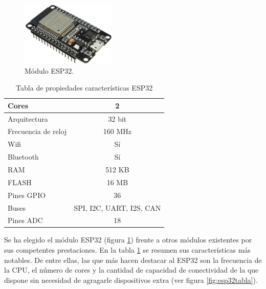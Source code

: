 	\begin{figure}[H]
		\centering
		\includegraphics[width=0.4\textwidth]{./img/esp32}
		\caption{Módulo ESP32. } 
		\label{fig:esp32}
	\end{figure} 


\begin{table}[H]
	\centering
	\begin{tabular}{|l|c|}
		\hline
		{\cellcolor[HTML]{EFEFEF}Cores}                                      & 2                             	\\ \hline
		{\cellcolor[HTML]{EFEFEF}Arquitectura}                               & 32 bit                         	\\ \hline
		{\cellcolor[HTML]{EFEFEF}Frecuencia de reloj} 						 & 160 MHz 							\\ \hline
		{\cellcolor[HTML]{EFEFEF}Wifi}                                       & Sí                             \\ \hline
		{\cellcolor[HTML]{EFEFEF}Bluetooth}                                  & Sí                             \\ \hline
		{\cellcolor[HTML]{EFEFEF}RAM}                                        & 512 KB                         \\ \hline
		{\cellcolor[HTML]{EFEFEF}FLASH}                                      & 16 MB                          \\ \hline
		{\cellcolor[HTML]{EFEFEF}Pines GPIO}                                 & 36                             \\ \hline
		{\cellcolor[HTML]{EFEFEF}Buses}                                      & SPI, I2C, UART, I2S, CAN       \\ \hline
		{\cellcolor[HTML]{EFEFEF}Pines ADC}                                  & 18                             \\ \hline
		
	\end{tabular}
	\caption{Tabla de propiedades características ESP32}
	\label{tabla:ESP32}
\end{table}

Se ha elegido el módulo ESP32 (figura \ref{fig:esp32}) frente a otros módulos existentes por sus competentes prestaciones. En la tabla \ref{tabla:ESP32} se resumen sus características más notables. De entre ellas, las que más hacen destacar al ESP32 son la frecuencia de la CPU, el número de cores y la cantidad de capacidad de conectividad de la que dispone sin necesidad de agragarle dispositivos extra (ver figura \ref{fig:esp32tabla}).


